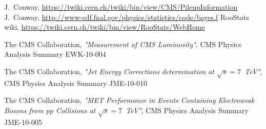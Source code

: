 \documentclass{cmspaper}
\begin{document}
\begin{thebibliography}{9}
    
    


     J.~Conway, \url{https://twiki.cern.ch/twiki/bin/view/CMS/PileupInformation}
     J.~Conway, \url{http://www-cdf.fnal.gov/physics/statistics/code/bayes.f}
     RooStats wiki, \url{https://twiki.cern.ch/twiki/bin/view/RooStats/WebHome}

    
     The CMS Collaboration, {\em "Measurement of CMS Luminosity"}, CMS Physics Analysis Summary EWK-10-004
    
     The CMS Collaboration, {\em "Jet Energy Corrections determination at $\sqrt{s}=7$~TeV"}, CMS Physics Analysis Summary JME-10-010
    
     The CMS Collaboration, {\em "MET Performance in Events Containing Electroweak Bosons from pp Collisions at $\sqrt{s}=7$~TeV"}, CMS Physics Analysis Summary JME-10-005

\end{thebibliography}

\pagebreak
\appendix
\end{document}
